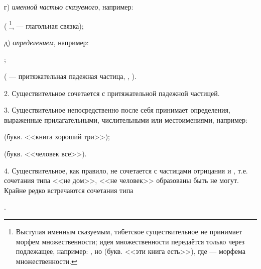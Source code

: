 г) \emph{именной частью сказуемого}, например:
\begin{prfsample}
    \item {}
    (
    \footnote[26]{
    Выступая именным сказуемым, тибетское существительное не принимает морфем множественности; идея множественности передаётся только через подлежащее, например: , но
    (букв. <<эти книга есть>>), где  --- морфема множественности.
    },
     --- глагольная связка);
\end{prfsample}

д) \emph{определением}, например:
\begin{prfsample}
    \item {};
    \item {}
\end{prfsample}
( --- притяжательная падежная частица, ,
).

2. Существительное сочетается с притяжательной падежной частицей.

3. Существительное непосредственно после себя принимает определения, выраженные прилагательными, числительными или местоимениями, например:
\begin{prfsample}
    \item {} (букв. <<книга хороший три>>);
    \item {} (букв. <<человек все>>).
\end{prfsample}

4. Существительное, как правило, не сочетается с частицами отрицания  и , т.е. сочетания типа <<не дом>>, <<не человек>> образованы быть не могут. Крайне редко встречаются сочетания типа
\begin{prfsample}
    \item {}.    
\end{prfsample}
